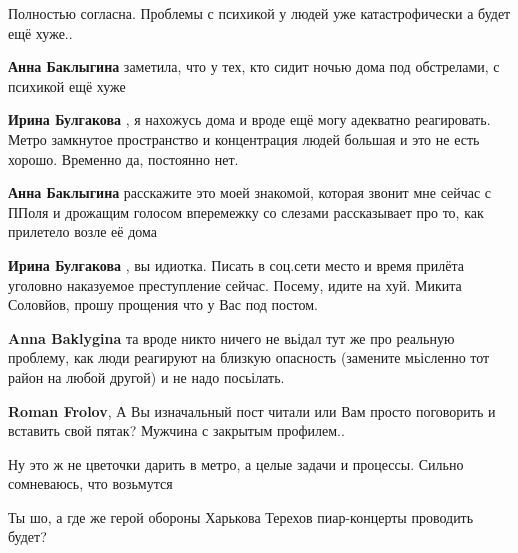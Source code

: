  
 
 
 
 
\zzSecCmt

\begin{itemize} %
Полностью согласна. Проблемы с психикой у людей уже катастрофически а будет ещё хуже..

\begin{itemize} %
\textbf{Анна Баклыгина} заметила, что у тех, кто сидит ночью дома под обстрелами, с психикой ещё хуже

\textbf{Ирина Булгакова} , я нахожусь дома и вроде ещё могу адекватно реагировать. Метро замкнутое пространство и концентрация людей большая и это не есть хорошо. Временно да, постоянно нет.

\textbf{Анна Баклыгина} расскажите это моей знакомой, которая звонит мне сейчас с ППоля и дрожащим голосом вперемежку со слезами рассказывает про то, как прилетело возле её дома

\textbf{Ирина Булгакова} , вы идиотка. Писать в соц.сети место и время прилёта уголовно наказуемое преступление сейчас. Посему, идите на хуй. Микита Соловйов, прошу прощения что у Вас под постом.

\textbf{Anna Baklygina} та вроде никто ничего не вьідал
тут же про реальную проблему, как люди реагируют на близкую опасность (замените мьісленно тот район на любой другой) и не надо посьілать.

\textbf{Roman Frolov}, А Вы изначальный пост читали или Вам просто поговорить и вставить свой пятак? Мужчина с закрытым профилем..
\end{itemize} %


Ну это ж не цветочки дарить в метро, а целые задачи и процессы. Сильно
сомневаюсь, что возьмутся


Ты шо, а где же герой обороны Харькова Терехов пиар-концерты проводить будет?


\end{itemize}

